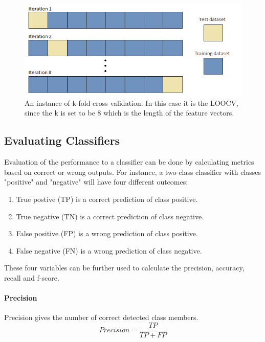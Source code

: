 \documentclass[USenglish]{ifimaster}  %
\begin{document}
 	
	\begin{figure}[h]
		\centering
		\includegraphics[scale=0.6]{Figures/Kfold}
		\caption[K-fold cross validation]{An instance of k-fold cross validation. In this case it is the LOOCV, since the k is set to be 8 which is the length of the feature vectors.}
		\label{fig:kfold}
	\end{figure}
	
	
	
\subsection{Evaluating Classifiers}\label{subsec:evalclf}
Evaluation of the performance to a classifier can be done by calculating metrics based on correct or wrong outputs. For instance, a two-class classifier with classes "positive" and "negative" will have four different outcomes:
	
	\begin{enumerate}
		\item True postive (TP) is a correct prediction of class positive.
		\item True negative (TN) is a correct prediction of class negative.
		\item False positive (FP) is a wrong prediction of class positive.
		\item False negative (FN) is a wrong prediction of class negative.
	\end{enumerate}
	
	These four variables can be further used to calculate the precision, accuracy, recall and f-score.
	
	\paragraph{Precision}
	Precision gives the number of correct detected class members.
	\begin{equation}
	Precision = \frac{TP}{TP + FP}
	\label{eq:prec}
	\end{equation}
	
\end{document}
